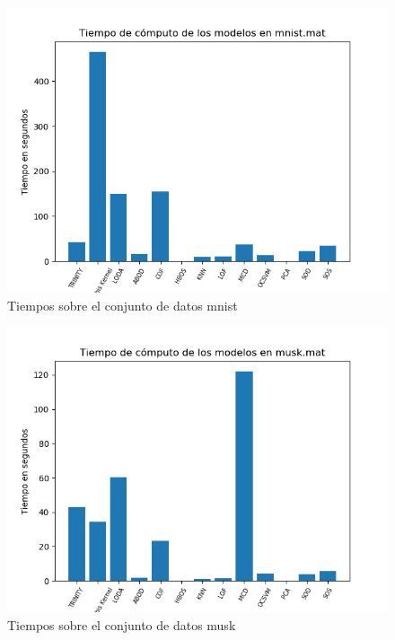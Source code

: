 \begin{figure}[H]
	\centering
	\label{mnist_times}
	\includegraphics[scale=0.7]{imagenes/imgs-exp1/times/mnist}
	\caption{Tiempos sobre el conjunto de datos mnist}
\end{figure}

\begin{figure}[H]
	\centering
	\label{musk_times}
	\includegraphics[scale=0.7]{imagenes/imgs-exp1/times/musk}
	\caption{Tiempos sobre el conjunto de datos musk}
\end{figure}

